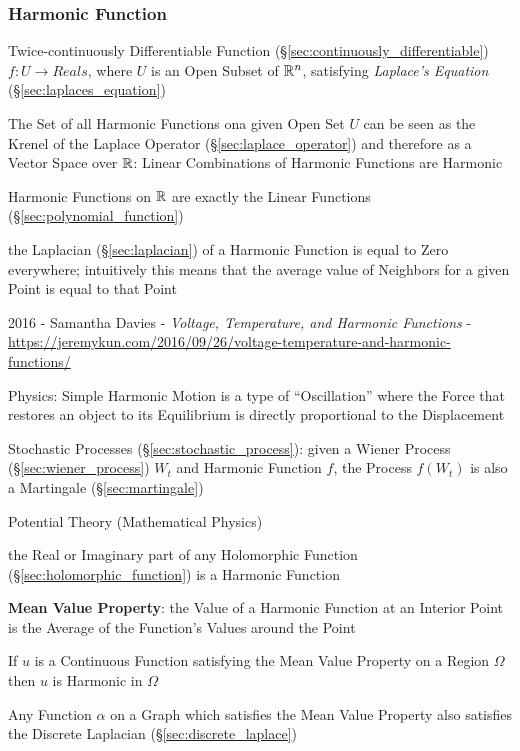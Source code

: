 \subsubsection{Harmonic Function}\label{sec:harmonic_function}

Twice-continuously Differentiable Function
(\S\ref{sec:continuously_differentiable}) $f : U \rightarrow Reals$,
where $U$ is an Open Subset of $\mathbb{R}^n$, satisfying \emph{Laplace's
  Equation} (\S\ref{sec:laplaces_equation})

The Set of all Harmonic Functions ona given Open Set $U$ can be seen as the
Krenel of the Laplace Operator (\S\ref{sec:laplace_operator}) and therefore as a
Vector Space over $\mathbb{R}$: Linear Combinations of Harmonic Functions are
Harmonic

Harmonic Functions on $\mathbb{R}$ are exactly the Linear Functions
(\S\ref{sec:polynomial_function})

the Laplacian (\S\ref{sec:laplacian}) of a Harmonic Function is equal to Zero
everywhere; intuitively this means that the average value of Neighbors for a
given Point is equal to that Point

2016 - Samantha Davies - \emph{Voltage, Temperature, and Harmonic
  Functions} -
\url{https://jeremykun.com/2016/09/26/voltage-temperature-and-harmonic-functions/}

Physics: Simple Harmonic Motion is a type of ``Oscillation'' where the
Force that restores an object to its Equilibrium is directly
proportional to the Displacement

Stochastic Processes (\S\ref{sec:stochastic_process}):
given a Wiener Process (\S\ref{sec:wiener_process}) $W_t$ and Harmonic Function
$f$, the Process $f(W_t)$ is also a Martingale (\S\ref{sec:martingale})


Potential Theory (Mathematical Physics) %

the Real or Imaginary part of any Holomorphic Function
(\S\ref{sec:holomorphic_function}) is a Harmonic Function


\textbf{Mean Value Property}: the Value of a Harmonic Function at an
Interior Point is the Average of the Function's Values around the
Point

If $u$ is a Continuous Function satisfying the Mean Value Property on
a Region $\Omega$ then $u$ is Harmonic in $\Omega$

Any Function $\alpha$ on a Graph which satisfies the Mean Value
Property also satisfies the Discrete Laplacian
(\S\ref{sec:discrete_laplace})


